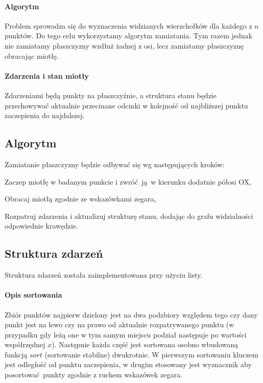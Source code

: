 \documentclass[12pt]{article}
\let\tempone\itemize
\let\temptwo\enditemize
\renewenvironment{itemize}{\tempone\setlength{\itemsep}{0cm}}{\temptwo}
\begin{document}
		\paragraph{Algorytm}
			Problem sprowadza się do wyznaczenia widzianych wierzchołków dla każdego z $ n $ punktów. Do tego celu wykorzystamy algorytm zamiatania. Tym razem jednak nie zamiatamy płaszczyzny wzdłuż żadnej z osi, lecz zamiatamy płaszczyznę obracając miotłę.
			
		\paragraph{Zdarzenia i stan miotły}
		Zdarzeniami będą punkty na płaszczyźnie, a struktura stanu będzie przechowywać aktualnie przecinane odcinki w kolejność od najbliższej punktu zaczepienia do najdalszej.
	
	\subsection{Algorytm}
		Zamiatanie płaszczyzny będzie odbywać się wg następujących kroków:
		\begin{itemize}
			\item Zaczep miotłę w badanym punkcie i zwróć ją w kierunku dodatnie półosi OX,
			\item Obracaj miotłą zgodnie ze wskazówkami zegara,
			\item Rozpatruj zdarzenia i aktualizuj strukturę stanu, dodając do grafu widzialności odpowiednie krawędzie.
		\end{itemize}
	
		\subsection{Struktura zdarzeń}
			Struktura zdarzeń została zaimplementowana przy użyciu listy. 
			
			\paragraph{Opis sortowania}
				Zbiór punktów najpierw dzielony jest na dwa podzbiory względem tego czy dany punkt jest na lewo czy na prawo od aktualnie rozpatrywanego punktu (w przypadku gdy leżą one w tym samym miejscu podział następuje po wartości współrzędnej $ x $). Następnie każda część jest sortowana osobno wbudowaną funkcją $ sort $ (sortowanie stabilne) dwukrotnie. W pierwszym sortowaniu kluczem jest odległość od punktu zaczepienia, w drugim stosowany jest wyznacznik aby posortować punkty zgodnie z ruchem wskazówek zegara.
			
\end{document}

